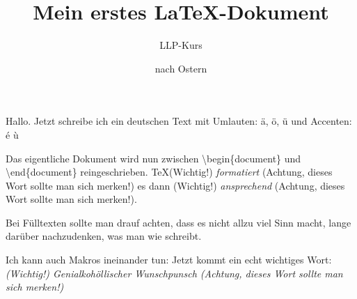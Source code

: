 \documentclass{scrartcl}
\title{Mein erstes \LaTeX-Dokument}
\author{LLP-Kurs}
\date{nach Ostern}
\newcommand{\wichtig}[1]{(Wichtig!) \emph{#1} (Achtung, dieses Wort sollte man sich merken!)}
\newcommand{\tb}{\textbackslash}
\begin{document}
\maketitle
  Hallo. Jetzt schreibe ich ein deutschen Text mit Umlauten: ä, ö, ü und Accenten: é ù %

  Das eigentliche Dokument wird nun zwischen
  \tb begin\{document\} und \tb end\{document\}
  reingeschrieben. \TeX \wichtig{formatiert}
  es dann \wichtig{ansprechend}.

  Bei Fülltexten sollte man drauf achten, dass es nicht
  allzu viel Sinn macht, lange darüber nachzudenken, was
  man wie schreibt.

  Ich kann auch Makros ineinander tun: Jetzt kommt ein echt
  wichtiges Wort:
  \emph{\wichtig{Genialkohöllischer Wunschpunsch}}
\end{document}
